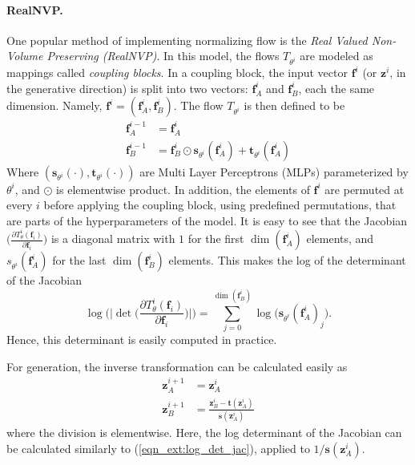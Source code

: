 \documentclass[letterpaper]{article} %
\begin{document}
\paragraph{RealNVP.}
One popular method of implementing normalizing flow is the \emph{Real Valued Non-Volume Preserving (RealNVP)}. In this model, the flows $T_{\theta^i}$ are modeled as mappings called \emph{coupling blocks}. In a coupling block, the input  vector $\mathbf{f}^i$ (or $\mathbf{z}^i$, in the generative direction) is split into two vectors: $\mathbf{f}^i_A$ and $\mathbf{f}^i_B$, each the same dimension. Namely, $\mathbf{f}^i=(\mathbf{f}^i_A,\mathbf{f}^i_B)$.
The flow $T_{\theta^i}$ is then defined to be
\begin{align}
    \mathbf{f}_A^{i-1}& = \mathbf{f}_A^i \\
    \mathbf{f}_B^{i-1} &= \mathbf{f}_B^i \odot \mathbf{s}_{\theta^i}(\mathbf{f}_A^i) + \mathbf{t}_{\theta^i}(\mathbf{f}_A^i) 
\end{align}
Where $(\mathbf{s}_{\theta^i}(\cdot), \mathbf{t}_{\theta^i}(\cdot))$ are Multi Layer Perceptrons (MLPs) parameterized by $\theta^i$, and $\odot$ is elementwise product. 
In addition, the elements of $\mathbf{f}^i$ are permuted at every $i$ before applying the coupling block, using predefined permutations, that are parts of the hyperparameters of the model.
It is easy to see that the Jacobian $\bigg( \frac{\partial T_\theta^i (\mathbf{f}_i)}{\partial  \mathbf{f}_i}  \bigg)$ is a diagonal matrix with $1$ for the first $\dim(\mathbf{f}_A^i)$ elements, and $s_{\theta^i}(\mathbf{f}_A^i)$ for the last $\dim(\mathbf{f}_B^i)$ elements. This  makes the log of the determinant of the Jacobian
\begin{equation}
\log\Bigg(\bigg| \det \bigg( \frac{\partial T_\theta^i (\mathbf{f}_i)}{\partial  \mathbf{f}_i}  \bigg) \bigg|\Bigg) = \sum_{j=0}^{\dim(\mathbf{f}_B^i)}\log \Big( \mathbf{s}_{\theta^i}(\mathbf{f}_A^i)_j \Big). 
 \label{eqn_ext:log_det_jac}   
\end{equation}
Hence, this determinant is easily computed in practice.

For generation, the inverse transformation can be calculated easily as
\begin{align*}
\mathbf{z}_A^{i+1} &= \mathbf{z}_A^{i} \\
\mathbf{z}_B^{i+1} &= \frac{\mathbf{z}_B^{i} - \mathbf{t}(\mathbf{z}_A^i)}{\mathbf{s}(\mathbf{z}_A^i)}
\end{align*}
where the division is elementwise.
Here, the log determinant of the Jacobian can be calculated similarly to (\ref{eqn_ext:log_det_jac}),  applied to $1/\mathbf{s}(\mathbf{z}_A^i)$.
\end{document}
